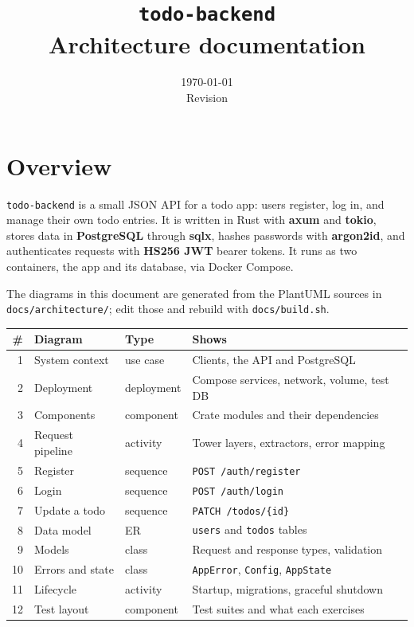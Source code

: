 \documentclass[a4paper,11pt]{article}
\title{\texttt{todo-backend}\\[0.3em]\large Architecture documentation}
\author{}
\date{\today\\[0.3em]\small Revision \texttt{\docversion}}
\begin{document}
\maketitle
\thispagestyle{empty}

\section*{Overview}

\texttt{todo-backend} is a small JSON API for a todo app: users register, log in, and manage
their own todo entries. It is written in Rust with \textbf{axum} and \textbf{tokio}, stores
data in \textbf{PostgreSQL} through \textbf{sqlx}, hashes passwords with \textbf{argon2id}, and
authenticates requests with \textbf{HS256 JWT} bearer tokens. It runs as two containers, the
app and its database, via Docker Compose.

The diagrams in this document are generated from the PlantUML sources in
\texttt{docs/architecture/}; edit those and rebuild with \texttt{docs/build.sh}.

\begin{center}
\small
\begin{tabular}{@{}rlll@{}}
  \toprule
  \# & Diagram & Type & Shows \\
  \midrule
  1  & System context   & use case   & Clients, the API and PostgreSQL \\
  2  & Deployment       & deployment & Compose services, network, volume, test DB \\
  3  & Components       & component  & Crate modules and their dependencies \\
  4  & Request pipeline & activity   & Tower layers, extractors, error mapping \\
  5  & Register         & sequence   & \texttt{POST /auth/register} \\
  6  & Login            & sequence   & \texttt{POST /auth/login} \\
  7  & Update a todo    & sequence   & \texttt{PATCH /todos/\{id\}} \\
  8  & Data model       & ER         & \texttt{users} and \texttt{todos} tables \\
  9  & Models           & class      & Request and response types, validation \\
  10 & Errors and state & class      & \texttt{AppError}, \texttt{Config}, \texttt{AppState} \\
  11 & Lifecycle        & activity   & Startup, migrations, graceful shutdown \\
  12 & Test layout      & component  & Test suites and what each exercises \\
  \bottomrule
\end{tabular}
\end{center}
\end{document}
